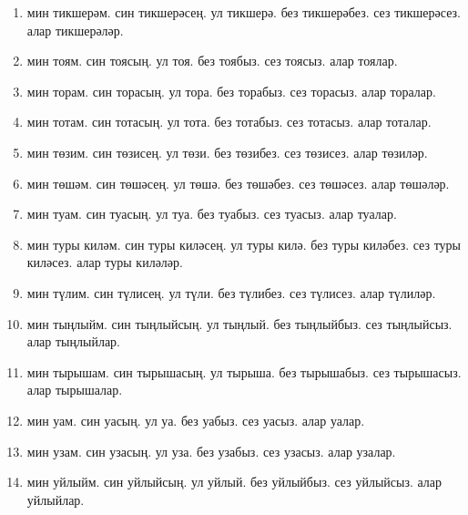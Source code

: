 \documentclass{article}
\begin{document}
\begin{enumerate}
    \item
    мин тикшерәм.
    син тикшерәсең.
    ул тикшерә.
    без тикшерәбез.
    сез тикшерәсез.
    алар тикшерәләр.

    \item
    мин тоям.
    син тоясың.
    ул тоя.
    без тоябыз.
    сез тоясыз.
    алар тоялар.

    \item
    мин торам.
    син торасың.
    ул тора.
    без торабыз.
    сез торасыз.
    алар торалар.

    \item
    мин тотам.
    син тотасың.
    ул тота.
    без тотабыз.
    сез тотасыз.
    алар тоталар.

    \item
    мин төзим.
    син төзисең.
    ул төзи.
    без төзибез.
    сез төзисез.
    алар төзиләр.

    \item
    мин төшәм.
    син төшәсең.
    ул төшә.
    без төшәбез.
    сез төшәсез.
    алар төшәләр.

    \item
    мин туам.
    син туасың.
    ул туа.
    без туабыз.
    сез туасыз.
    алар туалар.

    \item
    мин туры киләм.
    син туры киләсең.
    ул туры килә.
    без туры киләбез.
    сез туры киләсез.
    алар туры киләләр.

    \item
    мин түлим.
    син түлисең.
    ул түли.
    без түлибез.
    сез түлисез.
    алар түлиләр.

    \item
    мин тыңлыйм.
    син тыңлыйсың.
    ул тыңлый.
    без тыңлыйбыз.
    сез тыңлыйсыз.
    алар тыңлыйлар.

    \item
    мин тырышам.
    син тырышасың.
    ул тырыша.
    без тырышабыз.
    сез тырышасыз.
    алар тырышалар.

    \item
    мин уам.
    син уасың.
    ул уа.
    без уабыз.
    сез уасыз.
    алар уалар.

    \item
    мин узам.
    син узасың.
    ул уза.
    без узабыз.
    сез узасыз.
    алар узалар.

    \item
    мин уйлыйм.
    син уйлыйсың.
    ул уйлый.
    без уйлыйбыз.
    сез уйлыйсыз.
    алар уйлыйлар.


\end{enumerate}
\end{document}
